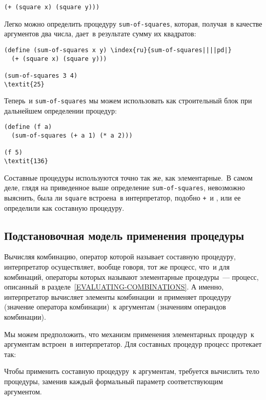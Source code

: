 \begin{Verbatim}[fontsize=\small]
(+ (square x) (square y)))
\end{Verbatim}
Легко можно определить процедуру
{\tt sum-of-squares}, которая, получая~в качестве
аргументов два числа, дает~в результате сумму их квадратов:

\begin{Verbatim}[fontsize=\small]
(define (sum-of-squares x y) \index{ru}{sum-of-squares||||pd|}
  (+ (square x) (square y)))

(sum-of-squares 3 4)
\textit{25}
\end{Verbatim}
Теперь~и {\tt sum-of-squares} мы можем использовать как 
строительный блок при дальнейшем определении процедур:

\begin{Verbatim}[fontsize=\small]
(define (f a)
  (sum-of-squares (+ a 1) (* a 2)))

(f 5)
\textit{136}
\end{Verbatim}
Составные процедуры используются точно так же,
как элементарные.~В 
самом деле, глядя на приведенное выше определение
{\tt sum-of-squares}, невозможно выяснить, была ли
{\tt square} встроена~в интерпретатор, подобно
{\tt +}~и {\tt *}, или ее определили
как составную процедуру.

\subsection{Подстановочная модель применения процедуры}
\label{SUBST-MODEL-FOR-PROC-APPL}

Вычисляя комбинацию, оператор которой называет составную 
процедуру, интерпретатор осуществляет, вообще говоря, тот же процесс, что~и 
для комбинаций, операторы которых называют элементарные процедуры~---
процесс, описанный~в разделе~\ref{EVALUATING-COMBINATIONS}. А именно,
интерпретатор вычисляет элементы комбинации~и применяет процедуру
(значение оператора комбинации)~к аргументам (значениям операндов
комбинации).

Мы можем предположить, что механизм применения
элементарных процедур~к аргументам встроен~в интерпретатор.  Для
составных процедур процесс протекает так:

\begin{plainlist}

\item Чтобы применить составную
процедуру~к аргументам, требуется вычислить тело процедуры, заменив каждый
формальный параметр соответствующим аргументом.
\end{plainlist}

